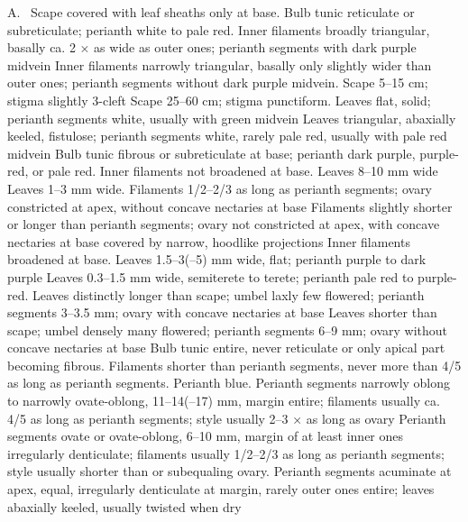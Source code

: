 \documentclass{ctexart}
\begin{document}
\begin{Key*}{A.~}
\alter Scape covered with leaf sheaths only at base.
\alter Bulb tunic reticulate or subreticulate; perianth white to pale red.
\alter Inner filaments broadly triangular, basally ca. 2 × as wide as outer ones; perianth segments with dark purple midvein
\alter Inner filaments narrowly triangular, basally only slightly wider than outer ones; perianth segments without dark purple midvein.
\alter Scape 5--15 cm; stigma slightly 3-cleft
\alter Scape 25--60 cm; stigma punctiform.
\alter Leaves flat, solid; perianth segments white, usually with green midvein
\alter Leaves triangular, abaxially keeled, fistulose; perianth segments white, rarely pale red, usually with pale red midvein
\alter Bulb tunic fibrous or subreticulate at base; perianth dark purple, purple-red, or pale red.
\alter Inner filaments not broadened at base.
\alter Leaves 8--10 mm wide
\alter Leaves 1--3 mm wide.
\alter Filaments 1/2--2/3 as long as perianth segments; ovary constricted at apex, without concave nectaries at base
\alter Filaments slightly shorter or longer than perianth segments; ovary not constricted at apex, with concave nectaries at base covered by narrow, hoodlike projections
\alter Inner filaments broadened at base.
\alter Leaves 1.5--3(--5) mm wide, flat; perianth purple to dark purple
\alter Leaves 0.3--1.5 mm wide, semiterete to terete; perianth pale red to purple-red.
\alter Leaves distinctly longer than scape; umbel laxly few flowered; perianth segments 3--3.5 mm; ovary with concave nectaries at base
\alter Leaves shorter than scape; umbel densely many flowered; perianth segments 6--9 mm; ovary without concave nectaries at base
\alter Bulb tunic entire, never reticulate or only apical part becoming fibrous.
\alter Filaments shorter than perianth segments, never more than 4/5 as long as perianth segments.
\alter Perianth blue.
\alter Perianth segments narrowly oblong to narrowly ovate-oblong, 11--14(--17) mm, margin entire; filaments usually ca. 4/5 as long as perianth segments; style usually 2--3 × as long as ovary
\alter Perianth segments ovate or ovate-oblong, 6--10 mm, margin of at least inner ones irregularly denticulate; filaments usually 1/2--2/3 as long as perianth segments; style usually shorter than or subequaling ovary.
\alter Perianth segments acuminate at apex, equal, irregularly denticulate at margin, rarely outer ones entire; leaves abaxially keeled, usually twisted when dry

\end{Key*}
\end{document}
